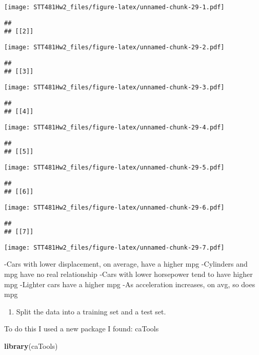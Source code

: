 \documentclass[]{article}
\newenvironment{Shaded}{\begin{snugshade}}{\end{snugshade}}
\newcommand{\KeywordTok}[1]{\textcolor[rgb]{0.13,0.29,0.53}{\textbf{#1}}}
\newcommand{\NormalTok}[1]{#1}
\providecommand{\tightlist}{%
  \setlength{\itemsep}{0pt}\setlength{\parskip}{0pt}}
\begin{document}
\texttt{[image: STT481Hw2\_files/figure-latex/unnamed-chunk-29-1.pdf]}

\begin{verbatim}
## 
## [[2]]
\end{verbatim}

\texttt{[image: STT481Hw2\_files/figure-latex/unnamed-chunk-29-2.pdf]}

\begin{verbatim}
## 
## [[3]]
\end{verbatim}

\texttt{[image: STT481Hw2\_files/figure-latex/unnamed-chunk-29-3.pdf]}

\begin{verbatim}
## 
## [[4]]
\end{verbatim}

\texttt{[image: STT481Hw2\_files/figure-latex/unnamed-chunk-29-4.pdf]}

\begin{verbatim}
## 
## [[5]]
\end{verbatim}

\texttt{[image: STT481Hw2\_files/figure-latex/unnamed-chunk-29-5.pdf]}

\begin{verbatim}
## 
## [[6]]
\end{verbatim}

\texttt{[image: STT481Hw2\_files/figure-latex/unnamed-chunk-29-6.pdf]}

\begin{verbatim}
## 
## [[7]]
\end{verbatim}

\texttt{[image: STT481Hw2\_files/figure-latex/unnamed-chunk-29-7.pdf]}

-Cars with lower displacement, on average, have a higher mpg -Cylinders
and mpg have no real relationship -Cars with lower horsepower tend to
have higher mpg -Lighter cars have a higher mpg -As acceleration
increases, on avg, so does mpg

\begin{enumerate}
\def\labelenumi{(\alph{enumi})}
\setcounter{enumi}{2}
\tightlist
\item
  Split the data into a training set and a test set.
\end{enumerate}

To do this I used a new package I found: caTools

\begin{Shaded}
\begin{Highlighting}[]
\KeywordTok{library}\NormalTok{(caTools)}
\end{Highlighting}
\end{Shaded}
\end{document}
